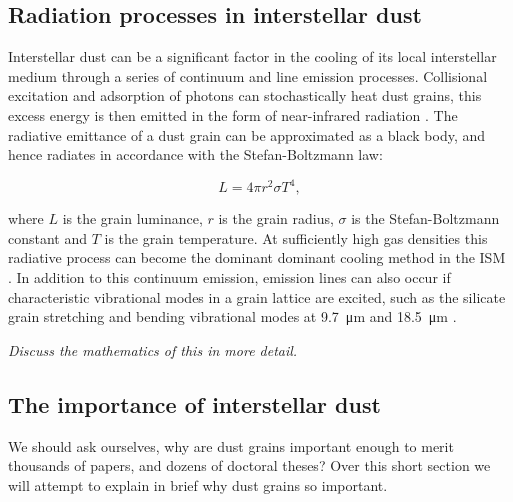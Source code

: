 \subsection{Radiation processes in interstellar dust}
\label{sec:dustcooling-background}

Interstellar dust can be a significant factor in the cooling of its local interstellar medium through a series of continuum and line emission processes.
Collisional excitation and adsorption of photons can stochastically heat dust grains, this excess energy is then emitted in the form of near-infrared radiation \parencite{dwekCoolingSputteringInfrared1996}.
The radiative emittance of a dust grain can be approximated as a black body, and hence radiates in accordance with the Stefan-Boltzmann law:

\begin{equation}
  L = 4\pi r^2 \sigma T^4 , 
\end{equation}

\noindent
where $L$ is the grain luminance, $r$ is the grain radius, $\sigma$ is the Stefan-Boltzmann constant and $T$ is the grain temperature.
At sufficiently high gas densities this radiative process can become the dominant dominant cooling method in the ISM \parencite{wolfireNeutralAtomicPhases1995}.
In addition to this continuum emission, emission lines can also occur if characteristic vibrational modes in a grain lattice are excited, such as the silicate grain stretching and bending vibrational modes at \SI{9.7}{\micro\metre} and \SI{18.5}{\micro\metre} \parencite[212]{whittetDustGalacticEnvironment2002}.

\textit{Discuss the mathematics of this in more detail.}


\subsection{The importance of interstellar dust}
\label{sec:dustimportance}

We should ask ourselves, why are dust grains important enough to merit thousands of papers, and dozens of doctoral theses?
Over this short section we will attempt to explain in brief why dust grains so important.



